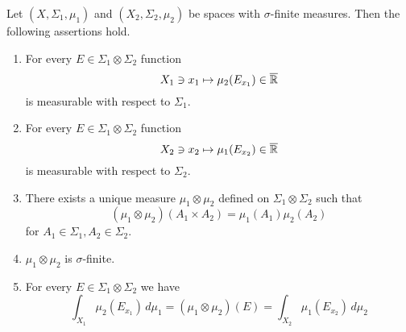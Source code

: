 \begin{theorem}\label{theorem:fubinis_theorem_basic}
Let $(X,\Sigma_1,\mu_1)$ and $(X_2,\Sigma_2,\mu_2)$ be spaces with $\sigma$-finite measures. Then the following assertions hold.
\begin{enumerate}[label=\emph{\textbf{(\arabic*)}}, leftmargin=*]
\item For every $E\in \Sigma_1\otimes \Sigma_2$ function
$$X_1\ni x_1\mapsto \mu_2(E_{x_1})\in \overline{{\mathbb R}}$$
is measurable with respect to $\Sigma_1$.
\item For every $E\in \Sigma_1\otimes \Sigma_2$ function
$$X_2\ni x_2\mapsto \mu_1(E_{x_2})\in \overline{{\mathbb R}}$$
is measurable with respect to $\Sigma_2$.
\item There exists a unique measure $\mu_1\otimes \mu_2$ defined on $\Sigma_1\otimes \Sigma_2$ such that
$$\left(\mu_1\otimes \mu_2\right)\left(A_1\times A_2\right) = \mu_1(A_1)\mu_2(A_2)$$
for $A_1\in \Sigma_1, A_2\in \Sigma_2$.
\item $\mu_1\otimes \mu_2$ is $\sigma$-finite.
\item For every $E\in \Sigma_1\otimes \Sigma_2$ we have
$$\int_{X_1}\mu_2(E_{x_1})\,d\mu_1 = \left(\mu_1\otimes \mu_2\right)(E) = \int_{X_2}\mu_1(E_{x_2})\,d\mu_2$$
\end{enumerate}
\end{theorem}
